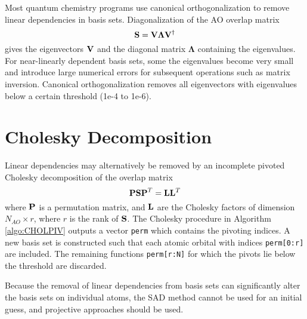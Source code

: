 Most quantum chemistry programs use canonical orthogonalization \cite{Low1956,Low1970} to remove linear dependencies in basis sets. Diagonalization of the AO overlap matrix
\begin{equation}
\mathbf{S} = \mathbf{V} \boldsymbol{\Lambda} \mathbf{V}^{\dagger}
\end{equation}
\noindent gives the eigenvectors $\mathbf{V}$ and the diagonal matrix $\boldsymbol{\Lambda}$ containing the eigenvalues. For near-linearly dependent basis sets, some the eigenvalues become very small and introduce large numerical errors for subsequent operations such as matrix inversion. Canonical orthogonalization removes all eigenvectors with eigenvalues below a certain threshold (1e-4 to 1e-6).

\section{Cholesky Decomposition}

Linear dependencies may alternatively be removed by an incomplete pivoted Cholesky decomposition of the overlap matrix \cite{Leh2019a} 
\begin{equation}
\mathbf{PSP}^T = \mathbf{L} \mathbf{L}^T
\end{equation}
\noindent where $\mathbf{P}$ is a permutation matrix, and $\mathbf{L}$ are the Cholesky factors of dimension $N_{AO} \times r$, where $r$ is the rank of $\mathbf{S}$. The Cholesky procedure in Algorithm \ref{algo:CHOLPIV} outputs a vector \texttt{perm} which contains the pivoting indices. A new basis set is constructed such that each atomic orbital with indices \texttt{perm[0:r]} are included. The remaining functions \texttt{perm[r:N]} for which the pivots lie below the threshold are discarded. 

Because the removal of linear dependencies from basis sets can significantly alter the basis sets on individual atoms, the SAD method cannot be used for an initial guess, and projective approaches should be used.

